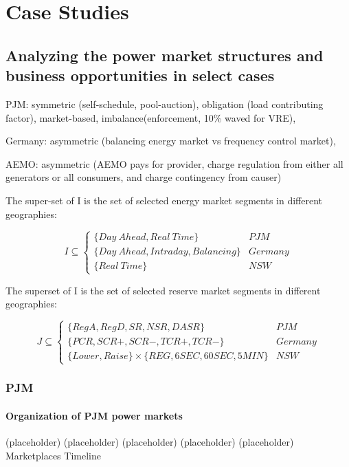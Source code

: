 \chapter{Case Studies}
\section{Analyzing the power market structures and business opportunities in select cases}

PJM: symmetric (self-schedule, pool-auction), obligation (load contributing factor), market-based, imbalance(enforcement, 10\% waved for VRE),

Germany: asymmetric (balancing energy market vs frequency control market), 

AEMO: asymmetric (AEMO pays for provider, charge regulation from either all generators or all consumers, and charge contingency from causer)

\label{sec:qualitative-analysis}
The super-set of I is the set of selected energy market segments in different geographies:

\begin{equation*}
I \subseteq  \begin{cases}
\{Day~Ahead, Real~Time\} & PJM \\
\{Day~Ahead, Intraday, Balancing\} & Germany \\
\{Real~Time\} & NSW
\end{cases}
\end{equation*}

The superset of I is the set of selected reserve market segments in different geographies:

\begin{equation*}
J \subseteq  \begin{cases}
\{RegA, RegD, SR, NSR, DASR\} & PJM \\
\{PCR, SCR+, SCR-, TCR+, TCR-\} & Germany \\
\{Lower, Raise\} \times \{REG, 6SEC, 60SEC, 5MIN\} & NSW
\end{cases}
\end{equation*}

\subsection{PJM}
\subsubsection{Organization of PJM power markets}
(placeholder)
\newpage
(placeholder)
\newpage
(placeholder)
\newpage
(placeholder)
\newpage
(placeholder)
\newpage
Marketplaces
Timeline

